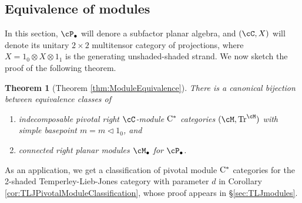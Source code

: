 \documentclass[11pt]{article}
\theoremstyle{plain}
\newtheorem{thm}{Theorem}[section]
\newtheorem*{thm*}{Theorem}
\theoremstyle{definition}
\DeclareMathOperator{\Tr}{Tr}
\newcommand{\Cstar}{\rm{C^*}}
\newcommand{\nn}[1]{\textcolor{red}{[[#1]]}}
\begin{document}
\subsection{Equivalence of modules}

In this section, $\cP_\bullet$ will denore a subfactor planar algebra, and $(\cC, X)$ will denote its unitary $2\times 2$ multitensor category of projections, where $X = 1_0 \otimes X \otimes 1_1$ is the generating unshaded-shaded strand.
We now sketch the proof of the following theorem.

\begin{thm*}[Theorem \ref{thm:ModuleEquivalence}]
There is a canonical bijection between equivalence classes of
\begin{enumerate}[label={\rm(\arabic*)}]
\item
indecomposable pivotal right $\cC$-module $\Cstar$ categories $(\cM,\Tr^\cM)$ with simple basepoint $m = m\vartriangleleft 1_0$, and
\item
connected right planar modules $\cM_\bullet$ for $\cP_\bullet$.
\end{enumerate}
\end{thm*}

As an application, we get a classification of pivotal module $\Cstar$ categories for the 2-shaded Temperley-Lieb-Jones category with parameter $d$ in Corollary \ref{cor:TLJPivotalModuleClassification}, whose proof appears in \S\ref{sec:TLJmodules}.

%

\end{document}
